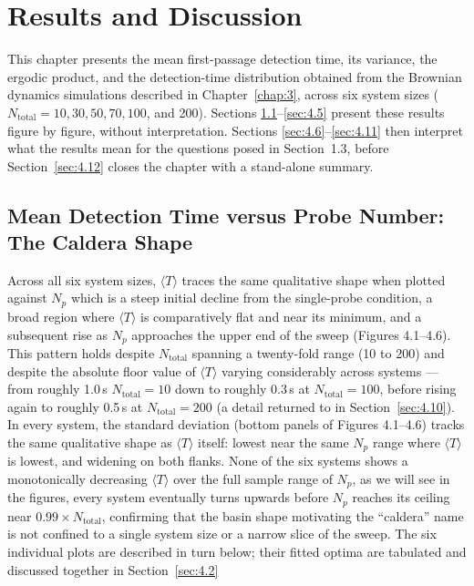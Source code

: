 \chapter{Results and Discussion}
\label{chap:4}
This chapter presents the mean first-passage detection time, its variance, the ergodic product, and the detection-time distribution obtained from the Brownian dynamics simulations described in Chapter~\ref{chap:3}, across six system sizes ($N_\text{total} = 10, 30, 50, 70, 100$, and 200). Sections \ref{sec:4.1}--\ref{sec:4.5} present these results figure by figure, without interpretation. Sections \ref{sec:4.6}--\ref{sec:4.11} then interpret what the results mean for the questions posed in Section~1.3, before Section~\ref{sec:4.12} closes the chapter with a stand-alone summary. 

\section{Mean Detection Time versus Probe Number: The Caldera Shape}
\label{sec:4.1}
Across all six system sizes, $\langle T \rangle$ traces the same qualitative shape when plotted against $N_p$ which is a steep initial decline from the single-probe condition, a broad region where $\langle T \rangle$ is comparatively flat and near its minimum, and a subsequent rise as $N_p$ approaches the upper end of the sweep (Figures 4.1--4.6). This pattern holds despite $N_\text{total}$ spanning a twenty-fold range (10 to 200) and despite the absolute floor value of $\langle T \rangle$ varying considerably across systems --- from roughly 1.0\,s $N_\text{total} = 10$ down to roughly 0.3\,s at $N_\text{total} = 100$, before rising again to roughly 0.5\,s at $N_\text{total} = 200$ (a detail returned to in Section~\ref{sec:4.10}). In every system, the standard deviation (bottom panels of Figures 4.1--4.6) tracks the same qualitative shape as $\langle T \rangle$ itself: lowest near the same $N_p$ range where $\langle T \rangle$ is lowest, and widening on both flanks. None of the six systems shows a monotonically decreasing $\langle T \rangle$ over the full sample range of $N_p$, as we will see in the figures, every system eventually turns upwards before $N_p$ reaches its ceiling near $0.99 \times N_\text{total}$, confirming that the basin shape motivating the ``caldera'' name is not confined to a single system size or a narrow slice of the sweep. The six individual plots are described in turn below; their fitted optima are tabulated and discussed together in Section~\ref{sec:4.2}

